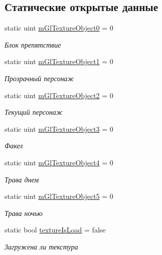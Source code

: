 \subsection*{Статические открытые данные}
\begin{DoxyCompactItemize}
\item 
static uint \hyperlink{class_game_1_1_extension_1_1_game_rendering_a6c0bd6e66bed4cf38ea83d0542992e04}{m\+Gl\+Texture\+Object0} = 0
\begin{DoxyCompactList}\small\item\em Блок препятствие \end{DoxyCompactList}\item 
static uint \hyperlink{class_game_1_1_extension_1_1_game_rendering_ad6609b7ae66edf828f7b547066efaf5a}{m\+Gl\+Texture\+Object1} = 0
\begin{DoxyCompactList}\small\item\em Прозрачный персонаж \end{DoxyCompactList}\item 
static uint \hyperlink{class_game_1_1_extension_1_1_game_rendering_ab090569badde0919e35aaee6370e206c}{m\+Gl\+Texture\+Object2} = 0
\begin{DoxyCompactList}\small\item\em Текущий персонаж \end{DoxyCompactList}\item 
static uint \hyperlink{class_game_1_1_extension_1_1_game_rendering_a8ec1596e0037600701b755599f6e11be}{m\+Gl\+Texture\+Object3} = 0
\begin{DoxyCompactList}\small\item\em Факел \end{DoxyCompactList}\item 
static uint \hyperlink{class_game_1_1_extension_1_1_game_rendering_accbd80315371256cc927e9b3baadfd6a}{m\+Gl\+Texture\+Object4} = 0
\begin{DoxyCompactList}\small\item\em Трава днем \end{DoxyCompactList}\item 
static uint \hyperlink{class_game_1_1_extension_1_1_game_rendering_a90bbb694accecc307b0898f75b038d57}{m\+Gl\+Texture\+Object5} = 0
\begin{DoxyCompactList}\small\item\em Трава ночью \end{DoxyCompactList}\item 
static bool \hyperlink{class_game_1_1_extension_1_1_game_rendering_a9748f6d2264411c2d27d6ed198defce6}{texture\+Is\+Load} = false
\begin{DoxyCompactList}\small\item\em Загружена ли текстура \end{DoxyCompactList}\end{DoxyCompactItemize}


